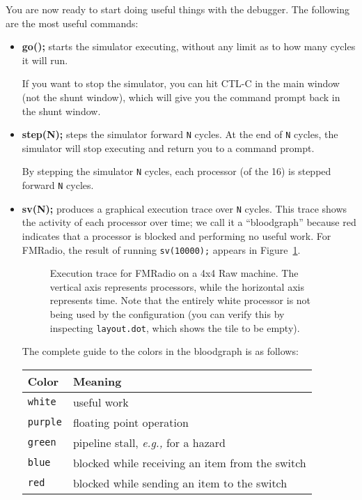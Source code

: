 You are now ready to start doing useful things with the debugger.  The
following are the most useful commands:

\begin{itemize}

\item {\bf go();} starts the simulator executing, without any limit as
to how many cycles it will run.

If you want to stop the simulator, you can hit CTL-C in the main
window (not the shunt window), which will give you the command prompt
back in the shunt window.

\item {\bf step(N);} steps the simulator forward \texttt{N} cycles. At
the end of {\tt N} cycles, the simulator will stop executing and
return you to a command prompt.

By stepping the simulator \texttt{N} cycles, each processor (of the
16) is stepped forward \texttt{N} cycles.

\item {\bf sv(N);} produces a graphical execution trace over {\tt N}
cycles.  This trace shows the activity of each processor over time; we
call it a ``bloodgraph'' because red indicates that a processor is
blocked and performing no useful work.  For FMRadio, the result of
running {\tt sv(10000);} appears in Figure~\ref{fig:fm-bloodgraph}.

\clearpage

\begin{figure}[t]
\begin{center}
\hspace{0pt}
\caption{\protect\small Execution trace for FMRadio on a 4x4 Raw
machine.  The vertical axis represents processors, while the
horizontal axis represents time.  Note that the entirely white
processor is not being used by the configuration (you can verify this
by inspecting {\tt layout.dot}, which shows the tile to be
empty).\protect\label{fig:fm-bloodgraph}}
\end{center}
\end{figure}

The complete guide to the colors in the bloodgraph is as follows: \vspace{6pt}

\begin{tabular}{|l|l|}
\hline
{\bf Color} & {\bf Meaning} \\
\hline
{\tt white} & useful work\\ \hline
{\tt purple} & floating point operation\\ \hline
{\tt green} & pipeline stall, {\it e.g.,} for a hazard\\ \hline
{\tt blue} & blocked while receiving an item from the switch\\ \hline
{\tt red} & blocked while sending an item to the switch\\ \hline
\end{tabular}


\end{itemize}
